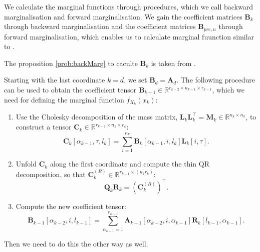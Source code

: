 We calculate the marginal functions through procedures, which we call backward marginalisation \cite{} and forward marginalisation.
We gain the coefficient matrices $\bm{B}_k$ through backward marginalisation and the coefficient matrices $\bm{B}_{pre,n}$ through forward marginalisation, which enables us to calculate marginal fuunction similar to \cite{}.




The proposition \ref{prob:backMarg} to caculte $\bm{B}_k$  is taken from \cite{}.

\begin{prop}
	Starting with the last coordinate $k = d$, we set $\bm{B}_d = \bm{A}_d$. The following procedure can be used to obtain the coefficient tensor $\bm{B}_{k-1} \in \mathbb{R}^{r_{k-2} \times n_{k-1} \times r_{k-1}}$, which we need for defining the marginal function $f_{X_k}(x_k)$:
	\begin{enumerate}
		\item Use the Cholesky decomposition of the mass matrix, $\bm{L}_k \bm{L}_k^\top = \bm{M}_k \in \mathbb{R}^{n_k \times n_k}$, to construct a tensor $\bm{C}_k \in \mathbb{R}^{r_{k-1} \times n_k \times r_k}$:
		\begin{equation}
			\bm{C}_k[\alpha_{k-1}, \tau, l_k] = \sum_{i=1}^{n_k} \bm{B}_k[\alpha_{k-1}, i, l_k] \bm{L}_k[i, \tau].
		\end{equation}
		\item Unfold $\bm{C}_k$ along the first coordinate and compute the thin QR decomposition, so that $\bm{C}_k^{(R)} \in \mathbb{R}^{r_{k-1} \times (n_k r_k)}$:
		\begin{equation}
			\bm{Q}_k \bm{R}_k = {(\bm{C}_k^{(R)})}^{\top}.
		\end{equation}
		\item Compute the new coefficient tensor:
		\begin{equation}
			\bm{B}_{k-1}[\alpha_{k-2}, i, l_{k-1}] = \sum_{\alpha_{k-1}=1}^{r_{k-1}} \bm{A}_{k-1}[\alpha_{k-2}, i, \alpha_{k-1}] \bm{R}_k[l_{k-1}, \alpha_{k-1}].
		\end{equation}
	\end{enumerate}
\label{prob:backMarg}
\end{prop}

Then we need to do this the other way as well.


